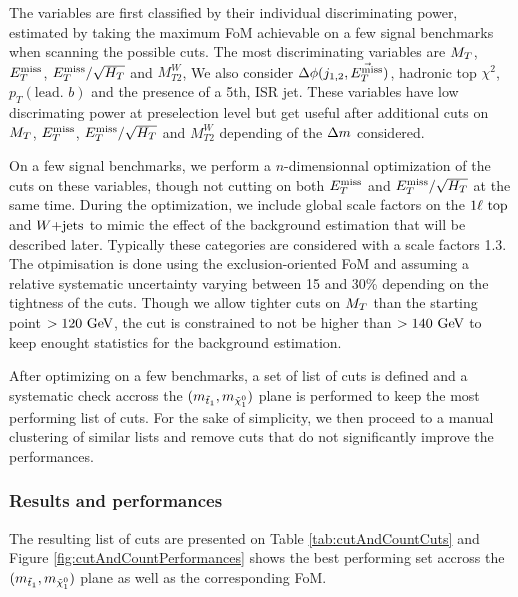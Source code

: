             The variables are first classified by their individual discriminating power, estimated by taking the 
            maximum FoM achievable on a few signal benchmarks when scanning the possible cuts. The most 
            discriminating variables are $M_T$, $E_T^\text{miss}$, $E_T^\text{miss}/\sqrt{H_T}$ and $M_{T2}^{W}$, We also consider 
            $\Delta \phi(j_{1,2},\vec{E_T^\text{miss}})$, hadronic top $\chi^2$, $p_T(\text{lead. } b)$ and the presence of a
            5th, ISR jet. These variables have low discrimating power at preselection level but get useful after
            additional cuts on $M_T$, $E_T^\text{miss}$, $E_T^\text{miss}/\sqrt{H_T}$ and $M_{T2}^W$ depending of the $\Delta m$ considered.

            On a few signal benchmarks, we perform a $n$-dimensionnal optimization of the cuts on these variables,
            though not cutting on both $E_T^\text{miss}$ and $E_T^\text{miss}/\sqrt{H_T}$ at the same time. During the optimization,
            we include global scale factors on the $1\ell~\text{top}$ and $\text{$W$+jets}$ to mimic the effect of the background
            estimation that will be described later. Typically these categories are considered with a scale factors
            1.3. The otpimisation is done using the exclusion-oriented FoM and assuming a relative systematic uncertainty
            varying between 15 and 30\% depending on the tightness of the cuts. Though we allow tighter cuts on $M_T$
            than the starting point $> 120 ~\text{GeV}$, the cut is constrained to not be higher than $> 140 ~\text{GeV}$ to keep
            enought statistics for the background estimation.

            After optimizing on a few benchmarks, a set of list of cuts is defined and a systematic check accross the
            $(m_{\tilde{t}_1},m_{\tilde{\chi}_1^0})$ plane is performed to keep the most performing list of cuts. For the
            sake of simplicity, we then proceed to a manual clustering of similar lists and remove cuts that do not 
            significantly improve the performances.

            \subsubsection{Results and performances}

            The resulting list of cuts are presented on Table \ref{tab:cutAndCountCuts} and Figure \ref{fig:cutAndCountPerformances}
            shows the best performing set accross the $(m_{\tilde{t}_1},m_{\tilde{\chi}_1^0})$ plane as well as the
            corresponding FoM.

